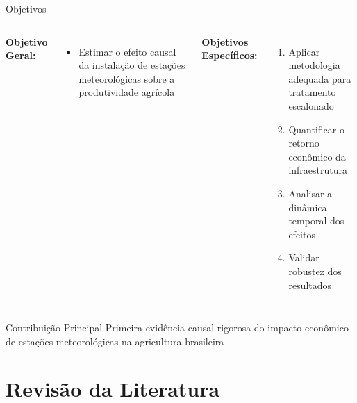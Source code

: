 \documentclass[10pt,aspectratio=169]{beamer}
\begin{document}
\begin{frame}{Objetivos}
\begin{columns}
\textbf{Objetivo Geral:}
\begin{itemize}
    \item Estimar o efeito causal da instalação de estações meteorológicas sobre a produtividade agrícola
\end{itemize}

\textbf{Objetivos Específicos:}
\begin{enumerate}
    \item Aplicar metodologia adequada para tratamento escalonado
    \item Quantificar o retorno econômico da infraestrutura
    \item Analisar a dinâmica temporal dos efeitos
    \item Validar robustez dos resultados
\end{enumerate}
\end{columns}

\vspace{0.5cm}
\begin{alertblock}{Contribuição Principal}
Primeira evidência causal rigorosa do impacto econômico de estações meteorológicas na agricultura brasileira
\end{alertblock}
\end{frame}

\section{Revisão da Literatura}
\end{document}
